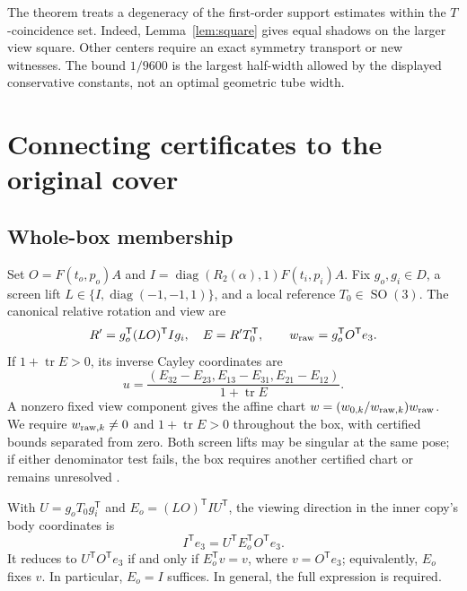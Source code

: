\documentclass[11pt]{amsart}
\newcommand{\SO}{\operatorname{SO}}
\newcommand{\diag}{\operatorname{diag}}
\newcommand{\tr}{\operatorname{tr}}
\theoremstyle{definition}
\theoremstyle{remark}
\begin{document}
The theorem treats a degeneracy of the first-order support estimates
within the $T$-coincidence set. Indeed, Lemma~\ref{lem:square} gives
equal shadows on the larger view square.
Other centers require an exact symmetry transport or new witnesses.
The bound $1/9600$ is the largest half-width allowed by the displayed
conservative constants, not an optimal geometric tube width.

\section{Connecting certificates to the original cover}\label{sec:membership}

\subsection{Whole-box membership}
Set $O=F(t_o,p_o)A$ and $I=\diag(R_2(\alpha),1)F(t_i,p_i)A$.
Fix $g_o,g_i\in D$, a screen lift
$L\in\{I,\diag(-1,-1,1)\}$, and a local reference $T_0\in\SO(3)$.
The canonical relative rotation and view are
\begin{equation}\label{eq:connection}
 R'=g_o^{\mathsf T}(LO)^{\mathsf T}Ig_i,\quad E=R'T_0^{\mathsf T},
 \qquad w_{\rm raw}=g_o^{\mathsf T}O^{\mathsf T}e_3.
\end{equation}
If $1+\tr E>0$, its inverse Cayley coordinates are
\begin{equation}\label{eq:inverse}
 u=\frac{(E_{32}-E_{23},E_{13}-E_{31},E_{21}-E_{12})}
                   {1+\tr E}.
\end{equation}
A nonzero fixed view component gives the affine chart
$w=(w_{0,k}/w_{{\rm raw},k})w_{\rm raw}$. We require
$w_{{\rm raw},k}\ne0$ and $1+\tr E>0$ throughout the box, with
certified bounds separated from zero. Both screen lifts may be singular
at the same pose; if either denominator test fails, the box requires
another certified chart or remains unresolved \cite{membership}.

With $U=g_oT_0g_i^{\mathsf T}$ and
$E_o=(LO)^{\mathsf T}IU^{\mathsf T}$, the viewing direction in the
inner copy's body coordinates is
\[
 I^{\mathsf T}e_3=U^{\mathsf T}E_o^{\mathsf T}O^{\mathsf T}e_3.
\]
It reduces to $U^{\mathsf T}O^{\mathsf T}e_3$ if and only if
$E_o^{\mathsf T}v=v$, where $v=O^{\mathsf T}e_3$; equivalently,
$E_o$ fixes $v$. In particular, $E_o=I$ suffices. In general, the full
expression is required.
\end{document}
